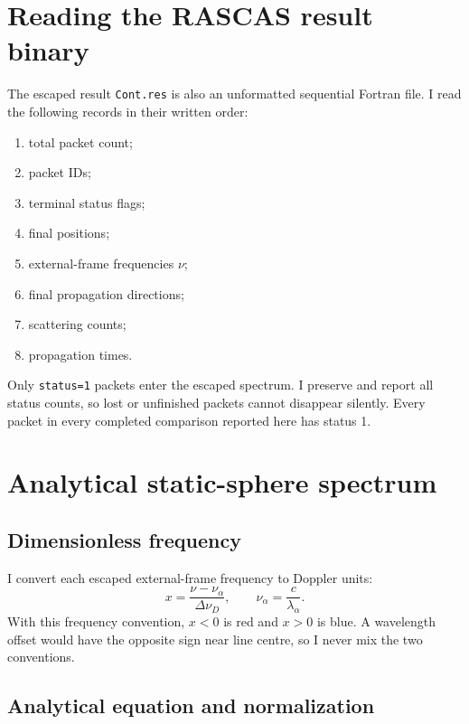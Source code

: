 \documentclass[11pt,a4paper]{article}
\begin{document}
\section{Reading the RASCAS result binary}

The escaped result \texttt{Cont.res} is also an unformatted sequential Fortran
file.  I read the following records in their written order:
\begin{enumerate}
\item total packet count;
\item packet IDs;
\item terminal status flags;
\item final positions;
\item external-frame frequencies $\nu$;
\item final propagation directions;
\item scattering counts;
\item propagation times.
\end{enumerate}
Only \texttt{status=1} packets enter the escaped spectrum.  I preserve and
report all status counts, so lost or unfinished packets cannot disappear
silently.  Every packet in every completed comparison reported here has status 1.

\section{Analytical static-sphere spectrum}

\subsection{Dimensionless frequency}

I convert each escaped external-frame frequency to Doppler units:
\begin{equation}
x=\frac{\nu-\nu_\alpha}{\Delta\nu_D},
\qquad
\nu_\alpha=\frac{c}{\lambda_\alpha}.
\label{eq:x}
\end{equation}
With this frequency convention, $x<0$ is red and $x>0$ is blue.  A wavelength
offset would have the opposite sign near line centre, so I never mix the two
conventions.

\subsection{Analytical equation and normalization}
\end{document}
